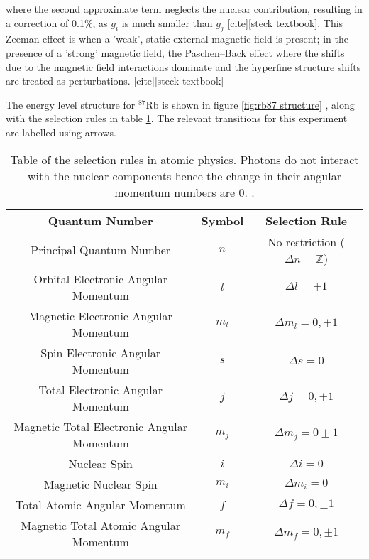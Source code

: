 \documentclass[12pt,twoside]{article}
\begin{document}
where the second approximate term neglects the nuclear contribution, resulting in a correction of 0.1\%, as $g_i$ is much smaller than $g_j$ [cite][steck textbook]. This Zeeman effect is when a 'weak', static external magnetic field is present; in the presence of a 'strong' magnetic field, the Paschen–Back effect where the shifts due to the magnetic field interactions dominate and the hyperfine structure shifts are treated as perturbations. [cite][steck textbook]


The energy level structure for $^{87}$Rb is shown in figure \ref{fig:rb87 structure} \cite{stark_thesis_2011}, along with the selection rules in table \ref{table:selection rules}. The relevant transitions for this experiment are labelled using arrows.


\begin{table}[h!]
  \captionsetup{font=footnotesize}
\begin{center}      
\begin{tabular}{c | c | c}
\textbf{Quantum Number} & \textbf{Symbol}        & \textbf{Selection Rule} \\
\hline
Principal Quantum Number & $n$ & No restriction ($\Delta n = {\mathbb{Z}}$) \\

Orbital Electronic Angular Momentum & $l$ & $\Delta l = \pm 1$ \\

Magnetic Electronic Angular Momentum & $m_l$ & $\Delta m_l = 0, \pm 1$ \\

Spin Electronic Angular Momentum & $s$ & $\Delta s = 0$ \\

Total Electronic Angular Momentum & $j$ & $\Delta j = 0, \pm 1$ \\

Magnetic Total Electronic Angular Momentum & $m_j$ & $\Delta m_j = 0 \pm 1$ \\

Nuclear Spin & $i$ & $\Delta i = 0$ \\

Magnetic Nuclear Spin & $m_i$ & $\Delta m_i = 0$ \\

Total Atomic Angular Momentum & $f$ & $\Delta f = 0, \pm 1$ \\

Magnetic Total Atomic Angular Momentum & $m_f$ & $\Delta m_f = 0, \pm 1$ \\

\end{tabular}
\newline \caption{Table of the selection rules in atomic physics. Photons do not interact with the nuclear components hence the change in their angular momentum numbers are 0. \cite{metcalf}\cite{ap notes} \cite{steck textbook}.}
\label{table:selection rules}
\end{center}
\vspace{-20pt}
\end{table}
\end{document}
